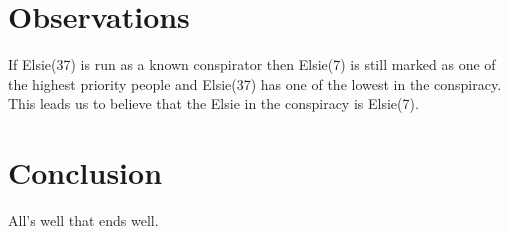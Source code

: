 \documentclass{icmmcm}
\begin{document}
\section{Observations}
If Elsie(37) is run as a known conspirator then Elsie(7) is still marked as one of the highest priority people and Elsie(37) has one of the lowest in the conspiracy.  This leads us to believe that the Elsie in the conspiracy is Elsie(7).
  	

\section{Conclusion}

All's well that ends well.






\end{document}
